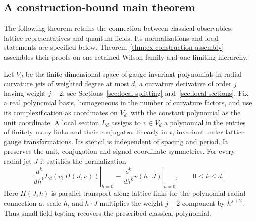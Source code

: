 \subsection{A construction-bound main theorem}
\label{ex-construction-headline}

The following theorem retains the connection between classical observables,
lattice representatives and quantum fields. Its normalizations and local
statements are specified below. Theorem~\ref{thm:ex-construction-assembly}
assembles their proofs on one retained Wilson family and one limiting
hierarchy.

Let $V_d$ be the finite-dimensional space of gauge-invariant polynomials
in radial curvature jets of weighted degree at most $d$, a curvature
derivative of order $j$ having weight $j+2$; see
Sections~\ref{sec:local-splitting} and~\ref{sec:local-sections}.
Fix a real polynomial basis, homogeneous in the number of curvature factors,
and use its complexification as coordinates on $V_d$, with the constant
polynomial as the unit coordinate.
A local section $L_d$ assigns to $v\in V_d$ a polynomial in the entries of
finitely many links and their conjugates, linearly in $v$, invariant under
lattice gauge transformations. Its stencil is independent of spacing and
period. It preserves the unit, conjugation and signed coordinate symmetries.
For every radial jet $J$ it satisfies the normalization
\begin{equation}\label{eq:headline-jet-normalization}
 \left.\frac{d^k}{dh^k}L_d(v;H(J,h))\right|_{h=0}
 =\left.\frac{d^k}{dh^k}v(h\cdot J)\right|_{h=0},\qquad 0\le k\le d.
\end{equation}
Here $H(J,h)$ is parallel transport along lattice links for the polynomial
radial connection at scale $h$, and $h\cdot J$ multiplies the weight-$j+2$
component by $h^{j+2}$. Thus small-field testing recovers the prescribed
classical polynomial.

